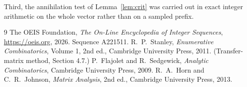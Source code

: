 \documentclass[11pt,a4paper]{article}
\theoremstyle{plain}
\theoremstyle{definition}
\begin{document}
Third, the annihilation test of Lemma~\ref{lem:crit} was carried out in exact integer
arithmetic on the whole vector rather than on a sampled prefix.

\begin{thebibliography}{9}
 The OEIS Foundation, \emph{The On-Line Encyclopedia of Integer
Sequences}, \url{https://oeis.org}, 2026. Sequence A221511.
 R.~P.~Stanley, \emph{Enumerative Combinatorics}, Volume 1, 2nd ed.,
Cambridge University Press, 2011. (Transfer-matrix method, Section 4.7.)
 P.~Flajolet and R.~Sedgewick, \emph{Analytic Combinatorics}, Cambridge
University Press, 2009.
 R.~A.~Horn and C.~R.~Johnson, \emph{Matrix Analysis}, 2nd ed., Cambridge
University Press, 2013.
\end{thebibliography}
\end{document}
